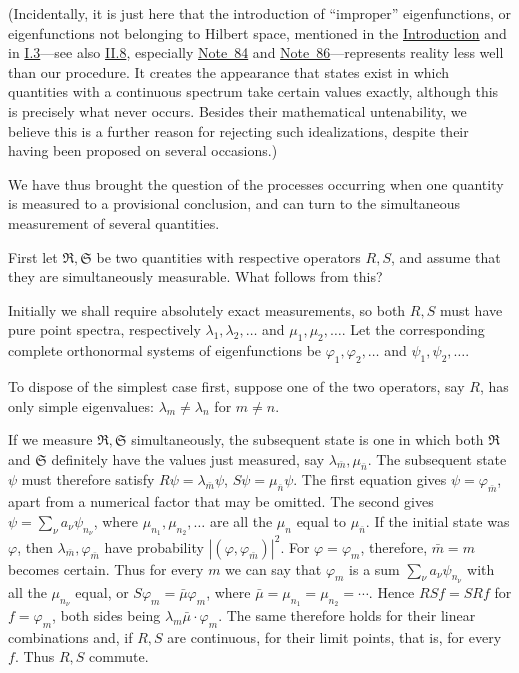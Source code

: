 \documentclass[fontsize=13pt,twoside,openany,headings=normal,parskip=false,bookmarkpackage=false,DIV=calc]{scrbook}
\begin{document}
(Incidentally, it is just here that the introduction of ``improper'' eigenfunctions, or eigenfunctions not belonging to Hilbert space, mentioned in the \hyperref[chap:introduction]{Introduction} and in \hyperref[sec:I.3]{I.3}---see also \hyperref[sec:II.8]{II.8}, especially \hyperlink{note-84}{Note~84} and \hyperlink{note-86}{Note~86}---represents reality less well than our procedure. It creates the appearance that states exist in which quantities with a continuous spectrum take certain values exactly, although this is precisely what never occurs. Besides their mathematical untenability, we believe this is a further reason for rejecting such idealizations, despite their having been proposed on several occasions.)

We have thus brought the question of the processes occurring when one quantity is measured to a provisional conclusion, and can turn to the simultaneous measurement of several quantities.

First let $\mathfrak R,\mathfrak S$ be two quantities with respective operators $R,S$, and assume that they are simultaneously measurable. What follows from this?

Initially we shall require absolutely exact measurements, so both $R,S$ must have pure point spectra, respectively $\lambda_1,\lambda_2,\ldots$ and $\mu_1,\mu_2,\ldots$. Let the corresponding complete orthonormal systems of eigenfunctions be $\varphi_1,\varphi_2,\ldots$ and $\psi_1,\psi_2,\ldots$.

To dispose of the simplest case first, suppose one of the two operators, say $R$, has only simple eigenvalues: $\lambda_m\ne\lambda_n$ for $m\ne n$.

If we measure $\mathfrak R,\mathfrak S$ simultaneously, the subsequent state is one in which both $\mathfrak R$ and $\mathfrak S$ definitely have the values just measured, say $\lambda_{\bar m},\mu_{\bar n}$. The subsequent state $\psi$ must therefore satisfy $R\psi=\lambda_{\bar m}\psi$, $S\psi=\mu_{\bar n}\psi$. The first equation gives $\psi=\varphi_{\bar m}$, apart from a numerical factor that may be omitted. The second gives $\psi=\sum_\nu a_\nu\psi_{n_\nu}$, where $\mu_{n_1},\mu_{n_2},\ldots$ are all the $\mu_n$ equal to $\mu_{\bar n}$. If the initial state was $\varphi$, then $\lambda_{\bar m},\varphi_{\bar m}$ have probability $|(\varphi,\varphi_{\bar m})|^2$. For $\varphi=\varphi_m$, therefore, $\bar m=m$ becomes certain. Thus for every $m$ we can say that $\varphi_m$ is a sum $\sum_\nu a_\nu\psi_{n_\nu}$ with all the $\mu_{n_\nu}$ equal, or $S\varphi_m=\bar\mu\varphi_m$, where $\bar\mu=\mu_{n_1}=\mu_{n_2}=\cdots$. Hence $RSf=SRf$ for $f=\varphi_m$, both sides being $\lambda_m\bar\mu\cdot\varphi_m$. The same therefore holds for their linear combinations and, if $R,S$ are continuous, for their limit points, that is, for every $f$. Thus $R,S$ commute.
\hypertarget{origpage-118}{}%
\end{document}
